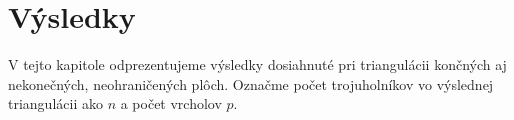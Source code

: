 \newcommand{\ApplyGradientH}[1]{%
  \iftoggle{inTableHeader}{#1}{
    \ifdim #1 pt > \MidNumberH pt
        \pgfmathsetmacro{\PercentColor}{max(min(100.0*(#1 - \MidNumberH)/(\MaxNumberH-\MidNumberH),100.0),0.00)} %
        \colorbox{green!\PercentColor!yellow}{#1}
    \else
        \pgfmathsetmacro{\PercentColor}{max(min(100.0*(\MidNumberH - #1)/(\MidNumberH-\MinNumberH),100.0),0.00)} %
        \colorbox{red!\PercentColor!yellow}{#1}
    \fi
  }
  }




\renewcommand{\arraystretch}{1}
\setlength{\fboxsep}{1mm} %
\setlength{\tabcolsep}{0pt}

\chapter{Výsledky}
\label{kap:results}

V tejto kapitole odprezentujeme výsledky dosiahnuté pri triangulácii končných aj 
nekonečných, neohraničených plôch. Označme počet trojuholníkov vo výslednej triangulácii 
ako $n$ a počet vrcholov $p$.

